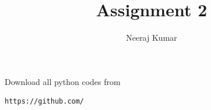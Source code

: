 \documentclass[journal,12pt,twocolumn]{IEEEtran}
\DeclareMathOperator*{\Res}{Res}
\begin{document}
\newtheorem{theorem}{Theorem}[section]
\newtheorem{problem}{Problem}
\newtheorem{proposition}{Proposition}[section]
\newtheorem{lemma}{Lemma}[section]
\newtheorem{corollary}[theorem]{Corollary}
\newtheorem{example}{Example}[section]
\newtheorem{definition}[problem]{Definition}

\newcommand{\BEQA}{\begin{eqnarray}}
\newcommand{\EEQA}{\end{eqnarray}}
\newcommand{\define}{\stackrel{\triangle}{=}}

\providecommand{\mbf}{\mathbf}
\providecommand{\pr}[1]{\ensuremath{\Pr\left(#1\right)}}
\providecommand{\qfunc}[1]{\ensuremath{Q\left(#1\right)}}
\providecommand{\sbrak}[1]{\ensuremath{{}\left[#1\right]}}
\providecommand{\lsbrak}[1]{\ensuremath{{}\left[#1\right.}}
\providecommand{\rsbrak}[1]{\ensuremath{{}\left.#1\right]}}
\providecommand{\brak}[1]{\ensuremath{\left(#1\right)}}
\providecommand{\lbrak}[1]{\ensuremath{\left(#1\right.}}
\providecommand{\rbrak}[1]{\ensuremath{\left.#1\right)}}
\providecommand{\cbrak}[1]{\ensuremath{\left\{#1\right\}}}
\providecommand{\lcbrak}[1]{\ensuremath{\left\{#1\right.}}
\providecommand{\rcbrak}[1]{\ensuremath{\left.#1\right\}}}
\theoremstyle{remark}
\newtheorem{rem}{Remark}
\newcommand{\sgn}{\mathop{\mathrm{sgn}}}
\providecommand{\abs}[1]{\l\vert#1\r\vert}
\providecommand{\res}[1]{\Res\displaylimits_{#1}}
\providecommand{\norm}[1]{\lVert#1\rVert}
\providecommand{\mtx}[1]{\mathbf{#1}}
\providecommand{\mean}[1]{E\l[ #1 \r]}
\providecommand{\fourier}{\overset{\mathcal{F}}{ \rightleftharpoons}}
\providecommand{\system}{\overset{\mathcal{H}}{ \longleftrightarrow}}
\newcommand{\solution}{\noindent \textbf{Solution: }}
\newcommand{\cosec}{\,\text{cosec}\,}
\providecommand{\dec}[2]{\ensuremath{\overset{#1}{\underset{#2}{\gtrless}}}}
\newcommand{\myvec}[1]{\ensuremath{\begin{pmatrix}#1\end{pmatrix}}}
\newcommand{\mydet}[1]{\ensuremath{\begin{vmatrix}#1\end{vmatrix}}}
\makeatletter
{}
\makeatother
\let\StandardTheFigure\thefigure
\let\vec\mathbf
\renewcommand{\thefigure}{\theproblem}
\def\putbox#1#2#3{\makebox[0in][l]{\makebox[#1][l]{}\raisebox{\baselineskip}[0in][0in]{\raisebox{#2}[0in][0in]{#3}}}}
\def\rightbox#1{\makebox[0in][r]{#1}}
\def\centbox#1{\makebox[0in]{#1}}
\def\topbox#1{\raisebox{-\baselineskip}[0in][0in]{#1}}
\def\midbox#1{\raisebox{-0.5\baselineskip}[0in][0in]{#1}}
\vspace{3cm}
\title{Assignment 2}
\author{Neeraj Kumar}
\maketitle
\newpage
\bigskip
\renewcommand{\thefigure}{\theenumi}
\renewcommand{\thetable}{\theenumi}
Download all python codes from
\begin{lstlisting}
https://github.com/
\end{lstlisting}
\end{document}
